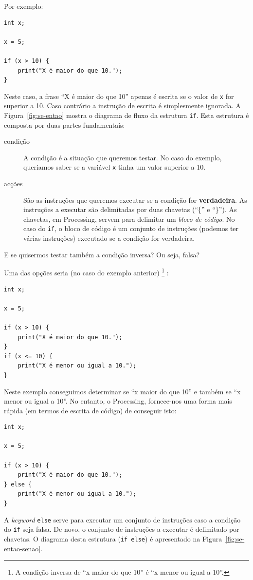 Por exemplo:
\begin{lstlisting}
int x;

x = 5;

if (x > 10) {
    print("X é maior do que 10.");
}
\end{lstlisting}
Neste caso, a frase ``X é maior do que 10'' apenas é escrita se
o valor de \texttt{x} for superior a 10. Caso contrário a instrução
de escrita é simplesmente ignorada. A Figura~\ref{fig:se-entao} mostra o diagrama de fluxo da estrutura
\texttt{if}. Esta estrutura é composta por duas partes fundamentais:
\begin{description}
\item[condição] 
A condição é a situação que queremos testar. No caso do exemplo, queriamos saber se a variável \texttt{x} tinha um valor superior a 10.

\item[acções]
São as instruções que queremos executar se a condição for \textbf{verdadeira}. As instruções a executar são delimitadas por duas chavetas (``\{'' e ``\}''). As chavetas, em Processing, servem para delimitar um \emph{bloco de código}. No caso do \texttt{if}, o bloco de código é um conjunto de instruções (podemos ter várias instruções) executado se a condição for verdadeira.
\end{description}

E se quisermos testar também a condição inversa? Ou seja, falsa?

Uma das opções seria (no caso do exemplo anterior)%
\footnote{A condição inversa de ``x maior do que 10'' é ``x menor ou igual a 10''.}%
:
\begin{lstlisting}
int x;

x = 5;

if (x > 10) {
    print("X é maior do que 10.");
}
if (x <= 10) {
    print("X é menor ou igual a 10.");
}
\end{lstlisting}
Neste exemplo conseguimos determinar se ``x maior do que 10'' e também se ``x menor ou igual a 10''. No entanto, o Processing, fornece-nos uma forma mais rápida (em termos de escrita de código) de conseguir isto:
\begin{lstlisting}
int x;

x = 5;

if (x > 10) {
    print("X é maior do que 10.");
} else {
    print("X é menor ou igual a 10.");
}
\end{lstlisting}

A \emph{keyword} \texttt{else} serve para executar um conjunto de instruções caso a condição do \texttt{if} seja falsa. De novo, o conjunto de instruções a executar é delimitado por chavetas.
O diagrama desta estrutura (\texttt{if else}) é apresentado na Figura~\ref{fig:se-entao-senao}.

